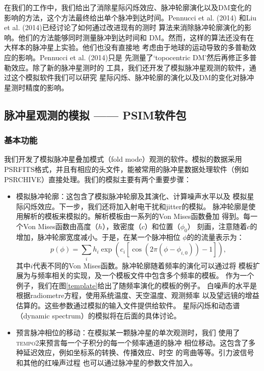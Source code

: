 在我们的工作中，我们给出了消除星际闪烁效应、脉冲轮廓演化以及DM变化的
影响的方法，这个方法最终给出单个脉冲到达时间。Pennucci et al. (2014)\supercite{Pennucci14}
和Liu et al. (2014)\supercite{Liu14}已经讨论了如何通过改进现有的测时
算法来消除脉冲轮廓演化的影响。他们的方法能够同时测量脉冲到达时间和
DM。然而，这样的算法还没有在大样本的脉冲星上实验。他们也没有直接地
考虑由于地球的运动导致的多普勒效应的影响。Pennucci et al. (2014)只是
先测量了`topocentric DM'然后再修正多普勒效应。除了新的脉冲星测时的
工具，我们还开发了模拟脉冲星观测的软件，通过这个模拟软件我们可以研究
星际闪烁、脉冲轮廓的演化以及DM的变化对脉冲星测时精度的影响。

\subsection{脉冲星观测的模拟 —— PSIM软件包}

\subsubsection{基本功能}

我们开发了模拟脉冲星叠加模式（fold mode）观测的软件。模拟的数据采用
PSRFITS格式，并且有相应的头文件，能被常用的脉冲星数据处理软件（例如
\textsc{PSRCHIVE}）直接处理。我们的模拟主要有两个重要步骤：
\begin{itemize}
\item 模拟脉冲轮廓：这包含了模拟脉冲轮廓及其演化、计算噪声水平以及
模拟星际闪烁效应。下一步，我们还将加入射电干扰和jitter的模拟。
%
脉冲轮廓是使用解析的模板来模拟的。解析模板由一系列的Von Mises函数叠加
得到。每一个Von Mises函数由高度（$h$），致密度（$c$）和位置（$\phi_0$）
刻画，注意随着$c$的增加，脉冲轮廓宽度减小。于是，在某一个脉冲相位
$\phi$的的流量表示为：
\begin{equation}
p(\phi)=\sum_{i} h_{i}\exp(c_{i}[\cos(2\pi(\phi-\phi_{i,0}))-1]),
\end{equation}
其中$i$代表不同的Von Mises函数。脉冲轮廓随着频率的演化可以通过将
模板扩展为与频率相关的实现，及一个模板文件中包含多个频率的模板。
作为一个例子，我们在图\ref{template}给出了随频率演化的模板的例子。
%
白噪声的水平是根据radiometre方程，使用系统温度、天空温度、观测频率
以及望远镜的增益估算的。这些参数通过模拟的输入文件提供给软件。
星际闪烁和动态谱（dynamic spectrum）的模拟将在后面的具体讨论。
\item 预言脉冲相位的移动：在模拟某一颗脉冲星的单次观测时，我们
使用了\textsc{tempo2}来预言每一个子积分的每一个频率通道的脉冲
相位移动。这包含了多种延迟效应，例如坐标系的转换、传播效应、时空
的弯曲等等\supercite{Edwards06}。引力波信号和其他的红噪声过程
也可以通过脉冲星的参数文件加入。
\end{itemize}


